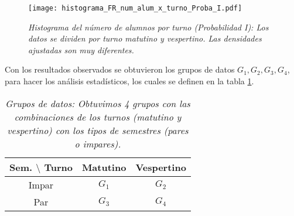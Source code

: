 \begin{figure}[h]
\centering
\texttt{[image: histograma\_FR\_num\_alum\_x\_turno\_Proba\_I.pdf]} %
\caption[\textit{Histograma del número de alumnos por turno: Probabilidad I}]{\textit{Histograma del número de alumnos por turno (Probabilidad I): Los datos se dividen por turno matutino y vespertino. Las densidades ajustadas son muy diferentes.}}\label{HistAlumTurnoProbaI}
\end{figure}

Con los resultados observados se obtuvieron los grupos de datos $G_{1}, G_{2}, G_{3}, G_{4}$, para hacer los análisis estadísticos, los cuales se definen en la tabla \ref{GposDatos}.

\begin{table}[h]
\centering
\begin{tabular}{|c|c|c|}
\hline 
\textbf{Sem.} $\setminus$ \textbf{Turno} & \textbf{Matutino} & \textbf{Vespertino} \\ 
\hline 
Impar & $G_{1}$ & $G_{2}$ \\ 
\hline 
Par & $G_{3}$ & $G_{4}$ \\ 
\hline 
\end{tabular}
\caption[\textit{Grupos de datos}]{\textit{Grupos de datos: Obtuvimos 4 grupos con las combinaciones de los turnos (matutino y vespertino) con los tipos de semestres (pares o impares).}}\label{GposDatos}
\end{table}
